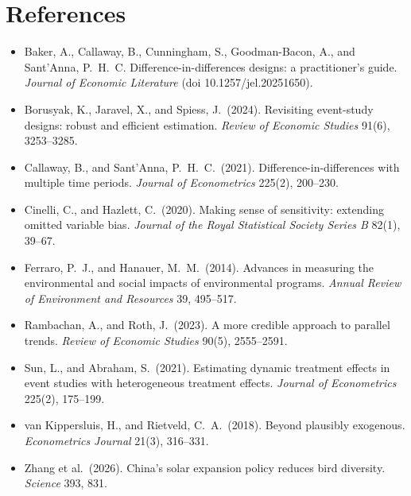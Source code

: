 \documentclass[11pt]{article}
\begin{document}
\section*{References}
\small
\begin{itemize}[leftmargin=12pt]
\item Baker, A., Callaway, B., Cunningham, S., Goodman-Bacon, A., and Sant'Anna, P.\ H.\ C. Difference-in-differences designs: a practitioner's guide. \textit{Journal of Economic Literature} (doi 10.1257/jel.20251650).
\item Borusyak, K., Jaravel, X., and Spiess, J.\ (2024). Revisiting event-study designs: robust and efficient estimation. \textit{Review of Economic Studies} 91(6), 3253--3285.
\item Callaway, B., and Sant'Anna, P.\ H.\ C.\ (2021). Difference-in-differences with multiple time periods. \textit{Journal of Econometrics} 225(2), 200--230.
\item Cinelli, C., and Hazlett, C.\ (2020). Making sense of sensitivity: extending omitted variable bias. \textit{Journal of the Royal Statistical Society Series B} 82(1), 39--67.
\item Ferraro, P.\ J., and Hanauer, M.\ M.\ (2014). Advances in measuring the environmental and social impacts of environmental programs. \textit{Annual Review of Environment and Resources} 39, 495--517.
\item Rambachan, A., and Roth, J.\ (2023). A more credible approach to parallel trends. \textit{Review of Economic Studies} 90(5), 2555--2591.
\item Sun, L., and Abraham, S.\ (2021). Estimating dynamic treatment effects in event studies with heterogeneous treatment effects. \textit{Journal of Econometrics} 225(2), 175--199.
\item van Kippersluis, H., and Rietveld, C.\ A.\ (2018). Beyond plausibly exogenous. \textit{Econometrics Journal} 21(3), 316--331.
\item Zhang et al.\ (2026). China's solar expansion policy reduces bird diversity. \textit{Science} 393, 831.
\end{itemize}
\end{document}
